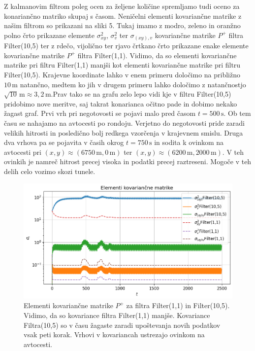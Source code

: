 \documentclass[slovene,11pt,a4paper]{article}
\begin{document}
Z kalmanovim filtrom poleg ocen za željene količine spremljamo tudi oceno za konariančno matriko skupaj s časom. Neničelni elementi kovariančne matrike z našim filtrom so prikazani na sliki 5. Tukaj imamo z modro, zeleno in oranžno polno črto prikazane elemente $\sigma_{xy}^2$, $\sigma_{v}^2$ ter $\sigma_{(xy),v}$ kovariančne matrike $P^+$ filtra Filter(10,5) ter z rdečo, vijolično ter rjavo črtkano črto prikazane enake elemente kovariančne matrike $P^+$ filtra Filter(1,1). Vidimo, da so elementi kovariančne matrike pri filtru Filter(1,1) manjši kot elementi kovariančne matrike pri filtru Filter(10,5). Krajevne koordinate lahko v enem primeru določimo na približno $10 \, \text{m}$ natančno, medtem ko jih v drugem primeru lahko določimo z natančnostjo $\sqrt{10} \, \text{m} \approx 3,2 \, \text{m}$.Prav tako se na grafu zelo lepo vidi kje v filtru Filter(10,5) pridobimo nove meritve, saj takrat konarianca očitno pade in dobimo nekako žagast graf. Prvi vrh pri negotovosti  se pojavi malo pred časom $t = 500 \, \text{s}$. Ob tem času se nahajamo na avtocesti po rondoju. Verjetno do negotovosti pride zaradi velikih hitrosti in posledično bolj redkega vzorčenja v krajevnem smislu. Druga dva vrhova pa se pojavita v časih okrog $t = 750 \, \text{s}$ in sodita k ovinkom na avtocesti pri $(x,y) \approx (6750 \, \text{m}, 0 \, \text{m})$ ter $(x,y) \approx (6200 \, \text{m}, 2000 \, \text{m})$. V teh ovinkih je namreč hitrost precej visoka in podatki precej raztreseni. Mogoče v teh delih celo vozimo skozi tunele.

\begin{figure}[h!]
\centering
\includegraphics[width=12cm]{slika5.png}
\caption{Elementi kovariančne matrike $P^+$ za filtra Filter(1,1) in Filter(10,5). Vidimo, da so kovariance filtra Filter(1,1) manjše. Kovariance Filtra(10,5) so v času žagaste zaradi upoštevanja novih podatkov vsak peti korak. Vrhovi v kovariancah ustrezajo ovinkom na avtocesti.}
\end{figure}
\end{document}

